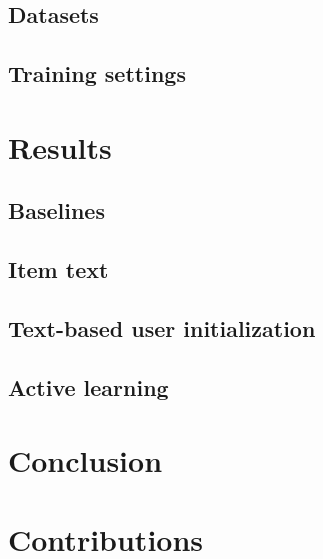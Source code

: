 \documentclass[10pt,twocolumn,letterpaper]{article}
\begin{document}
\subsection{Datasets}
\label{sec:datasets}

\subsection{Training settings}
\label{sec:training}

\section{Results}
\label{sec:results}

\subsection{Baselines}
\label{sec:baselines}

\subsection{Item text}
\label{sec:results_text}

\subsection{Text-based user initialization}
\label{sec:results_init}

\subsection{Active learning}
\label{sec:results_al}

\section{Conclusion}
\label{sec:conclusion}

\section{Contributions}
\label{sec:contributions}

{
    \small
    
    
}
\end{document}
